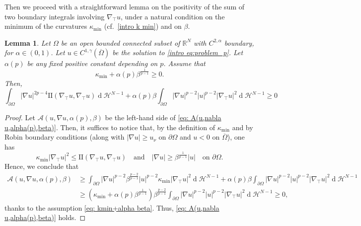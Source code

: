 \documentclass[10pt,a4paper, reqno]{amsart}
\numberwithin{equation}{section}
\newcommand{\R}{\mathbb{R}}
\newtheorem{lemma}[teo]{Lemma}
\renewcommand{\d}[1]{\ensuremath{\operatorname{d}\!{#1}}}
\begin{document}
    Then we proceed with a straightforward lemma on the positivity of the sum of two boundary integrals involving $\nabla_\top u$, under a natural condition on the minimum of the curvatures $\kappa_{\min}$ (cf.\, \eqref{intro k min}) and on $\beta$.
    \begin{lemma}\label{lemma positivity int II + int alpha(p)}
        Let $\Omega$ be an open bounded connected subset of $\R^N$ with $C^{2,\alpha}$ boundary, for $\alpha \in (0,1)$. Let $u \in C^{1,\gamma}(\overline{\Omega})$ be the solution to \eqref{intro eq:problem_p}. Let $\alpha(p)$ be any fixed positive constant depending on $p$. Assume that
        \begin{equation}\label{eq: kmin+alpha beta}
            \kappa_{\min} + \alpha(p) \beta^{\frac{1}{p-1}} \geq 0.
        \end{equation}
        Then,
        \begin{equation}\label{eq: A(u,nabla u,alpha(p),beta)}
            \int_{\partial\Omega} |\nabla u|^{2p-4} \mathrm{I\!I}(\nabla_\top u,\nabla_\top u) \d{}\mathcal{H}^{N-1} + \alpha(p) \beta \int_{\partial\Omega} |\nabla u|^{p-2}|u|^{p-2}|\nabla_\top u|^2 \d{}\mathcal{H}^{N-1} \geq 0
        \end{equation}
    \end{lemma}

    \begin{proof}
    Let $ \mathcal{A}(u,\nabla u, \alpha(p),\beta)$ be the left-hand side of \eqref{eq: A(u,nabla u,alpha(p),beta)}. Then, it suffices to notice that, by the definition of $\kappa_{\min}$ and by Robin boundary conditions (along with $|\nabla u|\geq u_\nu$ on $\partial\Omega$ and $u < 0$ on $\overline{\Omega}$), one has
    \begin{equation*}
        \kappa_{\min} |\nabla_\top u|^2 \leq \mathrm{I\!I}(\nabla_\top u,\nabla_\top u) \quad \text{and} \quad |\nabla u| \geq \beta^{\frac{1}{p-1}} |u| \quad \text{on } \partial\Omega.
    \end{equation*}
    Hence, we conclude that 
    \begin{equation*}
    \begin{split}
        \mathcal{A}(u,\nabla u, \alpha(p),\beta) &\geq \int_{\partial\Omega} |\nabla u|^{p-2} \beta^{\frac{p-2}{p-1}} |u|^{p-2} \kappa_{\min} |\nabla_\top u|^2  \d{}\mathcal{H}^{N-1} + \alpha(p)\beta \int_{\partial\Omega} |\nabla u|^{p-2}|u|^{p-2}|\nabla_\top u|^2 \d{}\mathcal{H}^{N-1}
        \\
        &\geq \left( \kappa_{\min} + \alpha(p) \beta^{\frac{1}{p-1}} \right) \beta^{\frac{p-2}{p-1}} \int_{\partial\Omega} |\nabla u|^{p-2}|u|^{p-2}|\nabla_\top u|^2
        \d{}\mathcal{H}^{N-1} \geq 0,
    \end{split}
    \end{equation*}
    thanks to the assumption \eqref{eq: kmin+alpha beta}. Thus, \eqref{eq: A(u,nabla u,alpha(p),beta)} holds.
    \end{proof}
\end{document}
